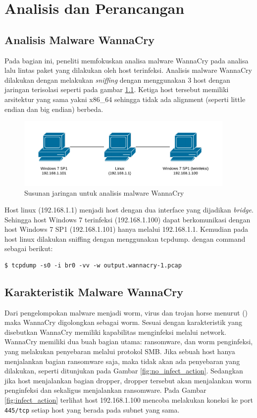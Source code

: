 \chapter{Analisis dan Perancangan}

\section{Analisis Malware WannaCry}

Pada bagian ini, peneliti memfokuskan analisa malware WannaCry pada analisa lalu lintas paket yang dilakukan oleh host terinfeksi. Analisis malware WannaCry dilakukan dengan melakukan \textit{sniffing} dengan menggunakan 3 host dengan jaringan terisolasi seperti pada gambar \ref{fig:analisis_malware_net}. Ketiga host tersebut memiliki arsitektur yang sama yakni x86\_64 sehingga tidak ada alignment (seperti little endian dan big endian) berbeda.

\begin{figure}[H]
	\centering
	\includegraphics[width=400px]{resources/analisis_malware_net.png}
	\caption{Susunan jaringan untuk analisis malware WannaCry}
	\label{fig:analisis_malware_net}
\end{figure}

Host linux (192.168.1.1) menjadi host dengan dua interface yang dijadikan \textit{bridge}. Sehingga host Windows 7 terinfeksi (192.168.1.100) dapat berkomunikasi dengan host Windows 7 SP1 (192.168.1.101) hanya melalui 192.168.1.1. Kemudian pada host linux dilakukan sniffing dengan menggunakan tcpdump. dengan command sebagai berikut:

\begin{verbatim}
$ tcpdump -s0 -i br0 -vv -w output.wannacry-1.pcap
\end{verbatim}

\section{Karakteristik Malware WannaCry}

Dari pengelompokan malware menjadi worm, virus dan trojan horse menurut (\cite{idika2007survey}) maka WannaCry digolongkan sebagai worm. Sesuai dengan karakteristik yang disebutkan WannaCry memiliki kapabilitas menginfeksi melalui network. WannaCry memiliki dua buah bagian utama: ransomware, dan worm penginfeksi, yang melakukan penyebaran melalui protokol SMB. Jika sebuah host hanya menjalankan bagian ransomware saja, maka tidak akan ada penyebaran yang dilakukan, seperti ditunjukan pada Gambar \ref{fig:no_infect_action}. Sedangkan jika host menjalankan bagian dropper, dropper tersebut akan menjalankan worm penginfeksi dan sekaligus menjalankan ransomware. Pada Gambar \ref{fig:infect_action} terlihat host 192.168.1.100  mencoba melakukan koneksi ke port \verb|445/tcp| setiap host yang berada pada subnet yang sama.

